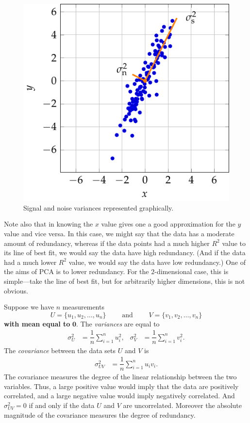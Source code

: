 \documentclass[a4paper, 12pt]{article}
\numberwithin{equation}{section}
\numberwithin{figure}{section}
\theoremstyle{definition}
\begin{document}
\begin{figure}[h]
    \centering
    \includegraphics{graphics/pca_example2.pdf}
    \caption{Signal and noise variances represented graphically.}
	\label{fig:pca-example2}
\end{figure}

Note also that in  knowing the $x$ value gives one a good
approximation for the $y$ value and vice versa. In this case, we might say that
the data has a moderate amount of redundancy, whereas if the data points had a
much higher $R^2$ value to its line of best fit, we would say the data have high
redundancy. (And if the data had a much lower $R^2$ value, we would say the data
have low redundancy.) One of the aims of PCA is to lower redundancy. For the
$2$-dimensional case, this is simple---take the line of best fit, but for
arbitrarily higher dimensions, this is not obvious. 

Suppose we have $n$ measurements 
\[ 
	U = \{u_1, u_2, \dots, u_n\} \qquad \text{ and } \qquad V = \{v_1, v_2, \dots, v_n\}
\] 
\textbf{with mean equal to} $\mathbf{0}$. The \textit{variances} are equal to 
\begin{align*} 
	\sigma_U^2 &= \dfrac{1}{n} \sum_{i=1}^n u_i^2, & \sigma_V^2 &= \dfrac{1}{n} \sum_{i=1}^n v_i^2 .
\end{align*} 
The \textit{covariance} between the data sets $U$ and $V$ is 
\begin{align*}
	\sigma_{UV}^2 &= \dfrac{1}{n} \sum_{i=1}^n u_iv_i.
\end{align*}
The covariance measures the degree of the linear relationship between the two
variables. Thus, a large positive value would imply that the data are positively
correlated, and a large negative value would imply negatively correlated. And
$\sigma_{UV}^2= 0$ if and only if the data $U$ and $V$ are uncorrelated.
Moreover the absolute magnitude of the covariance measures the degree of
redundancy. 
\end{document}
